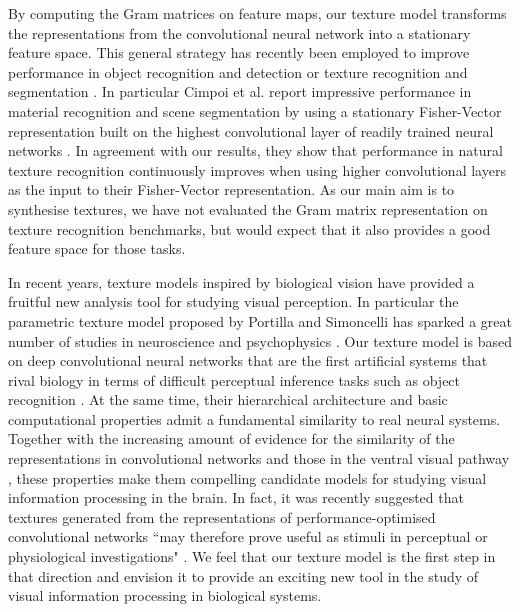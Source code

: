\documentclass{article} %
\begin{document}
By computing the Gram matrices on feature maps, our texture model transforms the representations from the convolutional neural network into a stationary feature space. This general strategy has recently been employed to improve performance in object recognition and detection \cite{he_spatial_2014} or texture recognition and segmentation \cite{cimpoi_deep_2014}. In particular Cimpoi et al. report impressive performance in material recognition and scene segmentation by using a stationary Fisher-Vector representation built on the highest convolutional layer of readily trained neural networks \cite{cimpoi_deep_2014}.  In agreement with our results, they show that performance in natural texture recognition continuously improves when using higher convolutional layers as the input to their Fisher-Vector representation. As our main aim is to synthesise textures, we have not evaluated the Gram matrix representation on texture recognition benchmarks, but would expect that it also provides a good feature space for those tasks.

In recent years, texture models inspired by biological vision have provided a fruitful new analysis tool for studying visual perception. In particular the parametric texture model proposed by Portilla and Simoncelli \cite{portilla_parametric_2000} has sparked a great number of studies in neuroscience and psychophysics \cite{freeman_functional_2013, freeman_metamers_2011, balas_summary-statistic_2009, rosenholtz_summary_2012, okazawa_image_2015}. Our texture model is based on deep convolutional neural networks that are the first artificial systems that rival biology in terms of difficult perceptual inference tasks such as object recognition \cite{krizhevsky_imagenet_2012, simonyan_very_2014, szegedy_going_2014}. At the same time, their hierarchical architecture and basic computational properties admit a fundamental similarity to real neural systems. Together with the increasing amount of evidence for the similarity of the representations in convolutional networks and those in the ventral visual pathway \cite{yamins_performance-optimized_2014, cadieu_deep_2014, khaligh-razavi_deep_2014}, these properties make them compelling candidate models for studying visual information processing in the brain. In fact, it was recently suggested that textures generated from the representations of performance-optimised convolutional networks ``may therefore prove useful as stimuli in perceptual or physiological investigations" \cite{movshon_representation_2015}. We feel that our texture model is the first step in that direction and envision it to provide an exciting new tool in the study of visual information processing in biological systems.
\end{document}
